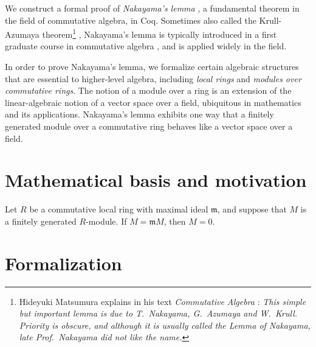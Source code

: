 \documentclass{article}
\begin{document}
We construct a formal proof of \emph{Nakayama's lemma} \cite{nakayama-1951, azumaya}, a fundamental theorem in the field of commutative algebra, in Coq. 
Sometimes also called the Krull-Azumaya theorem\footnote{Hideyuki Matsumura explains in his text \emph{Commutative Algebra} \cite{matsumura}:  \emph{This simple but important lemma is due to T.\ Nakayama, G.\ Azumaya
and W.\ Krull. Priority is obscure, and although it is usually called the Lemma of Nakayama, late Prof.\ 
Nakayama did not like the name.}}  \cite{nagata}, Nakayama's lemma is typically introduced in a first graduate course in commutative algebra \cite{atiyah-macdonald, matsumura, eisenbud}, and is applied widely in the field.   

In order to prove Nakayama's lemma,  we formalize certain algebraic structures that are essential to higher-level algebra, including \emph{local rings} and \emph{modules over commutative rings}. 
%
The notion of a module over a ring is an extension of the linear-algebraic notion of a vector space over a field, ubiquitous in mathematics and its applications. 
Nakayama's lemma exhibits one way that a finitely generated module over a commutative ring behaves like a vector space over a field.




\section{Mathematical basis and motivation}


\begin{nak*}
Let $R$ be a commutative local ring with maximal ideal $\mathfrak{m}$, and suppose that $M$ is a finitely generated $R$-module.  If $M = \mathfrak{m} M$, then $M = 0$.
\end{nak*}


\section{Formalization}
\end{document}
